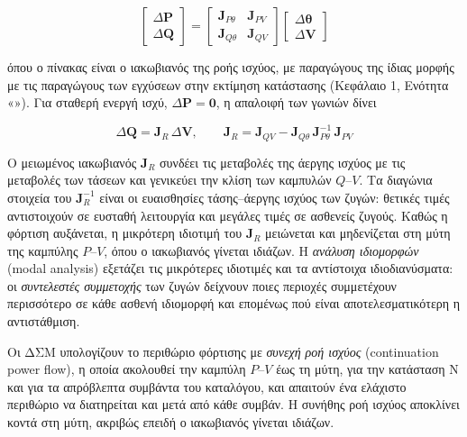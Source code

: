 \begin{equation}
\begin{bmatrix} \Delta\mathbf{P} \\ \Delta\mathbf{Q} \end{bmatrix} =
\begin{bmatrix} \mathbf{J}_{P\theta} & \mathbf{J}_{PV} \\
                \mathbf{J}_{Q\theta} & \mathbf{J}_{QV} \end{bmatrix}
\begin{bmatrix} \Delta\boldsymbol{\theta} \\ \Delta\mathbf{V} \end{bmatrix}
\label{eq:pf-jacobian}
\end{equation}

όπου ο πίνακας είναι ο ιακωβιανός της ροής ισχύος, με παραγώγους της ίδιας μορφής με τις
παραγώγους των εγχύσεων στην εκτίμηση κατάστασης (Κεφάλαιο 1, Ενότητα «»).
Για σταθερή ενεργή ισχύ, $\Delta\mathbf{P} = \mathbf{0}$, η απαλοιφή των γωνιών δίνει

\begin{equation}
\Delta\mathbf{Q} = \mathbf{J}_R\,\Delta\mathbf{V}, \qquad
\mathbf{J}_R = \mathbf{J}_{QV} - \mathbf{J}_{Q\theta}\,\mathbf{J}_{P\theta}^{-1}\,\mathbf{J}_{PV}
\label{eq:jr}
\end{equation}

Ο μειωμένος ιακωβιανός $\mathbf{J}_R$ συνδέει τις μεταβολές της άεργης ισχύος με τις
μεταβολές των τάσεων και γενικεύει την κλίση των καμπυλών $Q$--$V$. Τα διαγώνια στοιχεία του
$\mathbf{J}_R^{-1}$ είναι οι ευαισθησίες τάσης--άεργης ισχύος των ζυγών: θετικές τιμές
αντιστοιχούν σε ευσταθή λειτουργία και μεγάλες τιμές σε ασθενείς ζυγούς. Καθώς η φόρτιση
αυξάνεται, η μικρότερη ιδιοτιμή του $\mathbf{J}_R$ μειώνεται και μηδενίζεται στη μύτη της
καμπύλης $P$--$V$, όπου ο ιακωβιανός γίνεται ιδιάζων. Η \emph{ανάλυση ιδιομορφών} (modal
analysis) εξετάζει τις μικρότερες ιδιοτιμές και τα αντίστοιχα ιδιοδιανύσματα: οι
\emph{συντελεστές συμμετοχής} των ζυγών δείχνουν ποιες περιοχές συμμετέχουν περισσότερο σε
κάθε ασθενή ιδιομορφή και επομένως πού είναι αποτελεσματικότερη η αντιστάθμιση.

Οι ΔΣΜ υπολογίζουν το περιθώριο φόρτισης με \emph{συνεχή ροή ισχύος} (continuation power
flow), η οποία ακολουθεί την καμπύλη $P$--$V$ έως τη μύτη, για την κατάσταση N και για τα
απρόβλεπτα συμβάντα του καταλόγου, και απαιτούν ένα ελάχιστο περιθώριο να διατηρείται και μετά
από κάθε συμβάν. Η συνήθης ροή ισχύος αποκλίνει κοντά στη μύτη, ακριβώς επειδή ο ιακωβιανός
γίνεται ιδιάζων.

